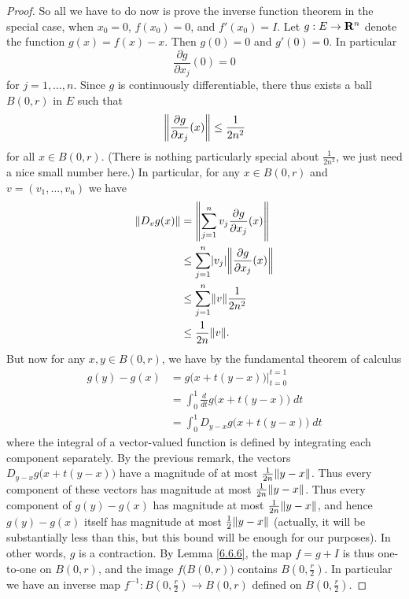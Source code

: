 \begin{proof}
    So all we have to do now is prove the inverse function theorem in the special case, when \(x_0 = 0\), \(f(x_0) = 0\), and \(f'(x_0) = I\).
    Let \(g : E \to \R^n\) denote the function \(g(x) = f(x) - x\).
    Then \(g(0) = 0\) and \(g'(0) = 0\).
    In particular
    \[
        \frac{\partial g}{\partial x_j}(0) = 0
    \]
    for \(j = 1, \dots, n\).
    Since \(g\) is continuously differentiable, there thus exists a ball \(B(0, r)\) in \(E\) such that
    \[
        \norm*{\frac{\partial g}{\partial x_j}(x)} \leq \frac{1}{2 n^2}
    \]
    for all \(x \in B(0, r)\).
    (There is nothing particularly special about \(\frac{1}{2 n^2}\), we just need a nice small number here.)
    In particular, for any \(x \in B(0, r)\) and \(v = (v_1, \dots, v_n)\) we have
    \begin{align*}
        \norm*{D_v g(x)} & = \norm*{\sum_{j = 1}^n v_j \frac{\partial g}{\partial x_j} (x)}         \\
                         & \leq \sum_{j = 1}^n \abs{v_j} \norm*{\frac{\partial g}{\partial x_j}(x)} \\
                         & \leq \sum_{j = 1}^n \norm*{v} \frac{1}{2 n^2}                            \\
                         & \leq \frac{1}{2n} \norm*{v}.
    \end{align*}
    But now for any \(x, y \in B(0, r)\), we have by the fundamental theorem of calculus
    \begin{align*}
        g(y) - g(x) & = g\big(x + t(y - x)\big) \big|_{t = 0}^{t = 1}       \\
                    & = \int_0^1 \frac{d}{dt} g\big(x + t(y - x)\big) \; dt \\
                    & = \int_0^1 D_{y - x} g\big(x + t(y - x)\big) \; dt
    \end{align*}
    where the integral of a vector-valued function is defined by integrating each component separately.
    By the previous remark, the vectors \(D_{y - x} g\big(x + t(y - x)\big)\) have a magnitude of at most \(\frac{1}{2n} \norm*{y - x}\).
    Thus every component of these vectors has magnitude at most \(\frac{1}{2n} \norm*{y - x}\).
    Thus every component of \(g(y) - g(x)\) has magnitude at most \(\frac{1}{2n} \norm*{y - x}\), and hence \(g(y) - g(x)\) itself has magnitude at most \(\frac{1}{2} \norm*{y - x}\)
    (actually, it will be substantially less than this, but this bound will be enough for our purposes).
    In other words, \(g\) is a contraction.
    By Lemma \ref{6.6.6}, the map \(f = g + I\) is thus one-to-one on \(B(0, r)\), and the image \(f\big(B(0, r)\big)\) contains \(B(0, \frac{r}{2})\).
    In particular we have an inverse map \(f^{-1} : B(0, \frac{r}{2}) \to B(0, r)\) defined on \(B(0, \frac{r}{2})\).


\end{proof}
